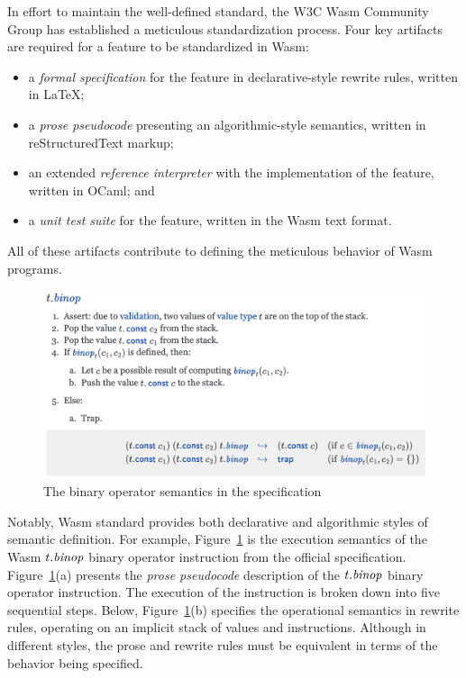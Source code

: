 In effort to maintain the well-defined standard, the W3C Wasm Community Group
has established a meticulous standardization process.  Four key artifacts are
required for a feature to be standardized in Wasm:
\begin{itemize}
  \item a \textit{formal specification} for the feature in declarative-style rewrite rules, written in LaTeX;
  \item a \textit{prose pseudocode} presenting an algorithmic-style semantics, written in reStructuredText markup;
  \item an extended \textit{reference interpreter} with the implementation of the feature, written in OCaml; and
  \item a \textit{unit test suite} for the feature, written in the Wasm text format.
\end{itemize}
All of these artifacts contribute to defining the meticulous behavior of
Wasm programs.

\begin{figure}[t]
\includegraphics[width=.7\textwidth]{../img/spec.png}
\caption{The binary operator semantics in the specification}
\label{fig:spec}
\end{figure}

Notably, Wasm standard provides both declarative and algorithmic styles of
semantic definition.  For example, Figure~\ref{fig:spec} is the execution
semantics of the Wasm $t.\mbox{\emph{binop}}$ binary operator instruction from
the official specification.  Figure~\ref{fig:spec}(a) presents the
\textit{prose pseudocode} description of the $t.\mbox{\emph{binop}}$ binary
operator instruction.  The execution of the instruction is broken down into
five sequential steps.  Below, Figure~\ref{fig:spec}(b) specifies the
operational semantics in rewrite rules, operating on an implicit stack of
values and instructions.   Although in different styles, the prose and rewrite rules must be
equivalent in terms of the behavior being specified.

